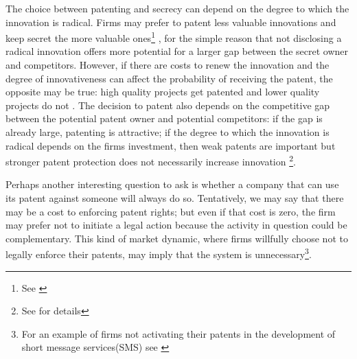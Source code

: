 
The choice between patenting and secrecy can depend on the degree to which the innovation is radical. Firms may prefer to patent less valuable innovations and keep secret the more valuable ones\footnote{See \cite{Anton2004}} , for the simple reason that not disclosing a radical innovation offers more potential for a larger gap between the secret owner and competitors. However, if there are costs to renew the innovation and the degree of innovativeness can affect the probability of receiving the patent, the opposite may be true: high quality projects get patented and lower quality projects do not \citep{Mose2011}. The decision to patent also depends on the competitive gap between the potential patent owner and potential competitors: if the gap is already large, patenting is attractive; if the degree to which the innovation is radical depends on the firms investment, then weak patents are important but stronger patent protection does not necessarily increase innovation \footnote{See \cite{Kultti2006} for details}. %

Perhaps another interesting question to ask is whether a company that can use its patent against someone will always do so. Tentatively, we may say that there may be a cost to enforcing patent rights; but even if that cost is zero, the firm may prefer not to initiate a legal action because the activity in question could be complementary. This kind of market dynamic, where firms willfully choose not to legally enforce their patents, may imply that the system is unnecessary\footnote{For an example of firms not activating their patents in the development of short message services(SMS) see \cite{corrocher2013development}}.

